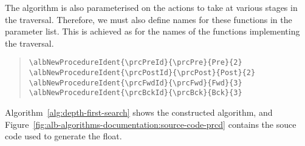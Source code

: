 \documentclass[11pt,a4paper,oneside,titlepage]{alb-latex}
\begin{document}
The algorithm is also parameterised on the actions to take at various
stages in the traversal.  Therefore, we must also define names for these
functions in the parameter list.  This is achieved as for the names of
the functions implementing the traversal.

\begin{quote}
\begin{verbatim}
\albNewProcedureIdent{\prcPreId}{\prcPre}{Pre}{2}
\albNewProcedureIdent{\prcPostId}{\prcPost}{Post}{2}
\albNewProcedureIdent{\prcFwdId}{\prcFwd}{Fwd}{3}
\albNewProcedureIdent{\prcBckId}{\prcBck}{Bck}{3}
\end{verbatim}
\end{quote}


Algorithm~\ref{alg:depth-first-search} shows the constructed algorithm,
and Figure~\ref{fig:alb-algorithms-documentation:source-code-prcd}
contains the souce code used to generate the float.
\end{document}
